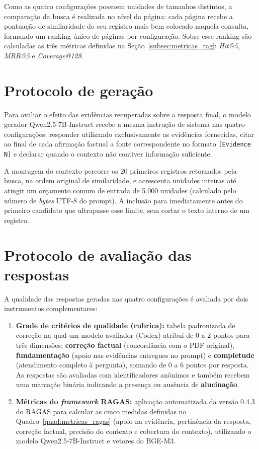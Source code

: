 Como as quatro configurações possuem unidades de tamanhos distintos, a comparação da busca é realizada no nível da página: cada página recebe a pontuação de similaridade do seu registro mais bem colocado naquela consulta, formando um ranking único de páginas por configuração. Sobre esse ranking são calculadas as três métricas definidas na Seção~\ref{subsec:metricas_rag}: \textit{Hit@5}, \textit{MRR@5} e \textit{Coverage@128}.

\section{Protocolo de geração}
\label{sec:protocolo_geracao}

Para avaliar o efeito das evidências recuperadas sobre a resposta final, o modelo gerador Qwen2.5-7B-Instruct recebe a mesma instrução de sistema nas quatro configurações: responder utilizando exclusivamente as evidências fornecidas, citar ao final de cada afirmação factual a fonte correspondente no formato \texttt{[Evidence N]} e declarar quando o contexto não contiver informação suficiente.

A montagem do contexto percorre os 20 primeiros registros retornados pela busca, na ordem original de similaridade, e acrescenta unidades inteiras até atingir um orçamento comum de entrada de 5.000 unidades (calculado pelo número de \textit{bytes} UTF-8 do prompt). A inclusão para imediatamente antes do primeiro candidato que ultrapasse esse limite, sem cortar o texto interno de um registro.

\section{Protocolo de avaliação das respostas}
\label{sec:avaliacao_qualidade}

A qualidade das respostas geradas nas quatro configurações é avaliada por dois instrumentos complementares:

\begin{enumerate}
    \item \textbf{Grade de critérios de qualidade (rubrica):} tabela padronizada de correção na qual um modelo avaliador (Codex) atribui de 0 a 2 pontos para três dimensões: \textbf{correção factual} (concordância com o PDF original), \textbf{fundamentação} (apoio nas evidências entregues no prompt) e \textbf{completude} (atendimento completo à pergunta), somando de 0 a 6 pontos por resposta. As respostas são avaliadas com identificadores anônimos e também recebem uma marcação binária indicando a presença ou ausência de \textbf{alucinação}.

    \item \textbf{Métricas do \textit{framework} RAGAS:} aplicação automatizada da versão 0.4.3 do RAGAS  para calcular as cinco medidas definidas no Quadro~\ref{quad:metricas_ragas} (apoio na evidência, pertinência da resposta, correção factual, precisão do contexto e cobertura do contexto), utilizando o modelo Qwen2.5-7B-Instruct e vetores do BGE-M3.
\end{enumerate}
